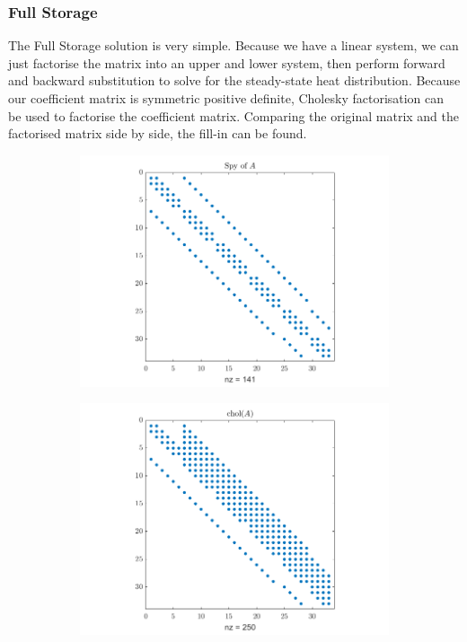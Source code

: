 \documentclass[12pt,a4paper]{article}
\begin{document}
\subsubsection{Full Storage}
The Full Storage solution is very simple. Because we have a linear system, we can just factorise the matrix into an upper and lower system, then perform forward and backward substitution to solve for the steady-state heat distribution. Because our coefficient matrix is symmetric positive definite, Cholesky factorisation can be used to factorise the coefficient matrix. Comparing the original matrix and the factorised matrix side by side, the fill-in can be found.
\begin{figure}[H]
	\hspace{-8mm}
	\begin{subfigure}[b]{0.6\textwidth}
		\hspace{-8mm}
		\includegraphics[width=\textwidth]{images/spyA.png}
	\end{subfigure}
	\hspace{-8mm}
	\begin{subfigure}[b]{0.6\textwidth}
		\hspace{-8mm}
		\includegraphics[width=\textwidth]{images/cholA.png}
	\end{subfigure}
\end{figure}
\end{document}
